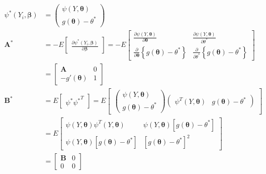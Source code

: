 \documentclass[
  letterpaper,
  DIV=11,
  numbers=noendperiod]{scrreprt}
\begin{document}
\[\begin{aligned}
\psi^* (Y_i, \boldsymbol \beta) &= \begin{pmatrix} \psi(Y, \boldsymbol \theta) \\ g(\boldsymbol \theta) - \theta^* \end{pmatrix} \\
\mathbf A^* &= - E \begin{bmatrix} \frac{\partial \psi^* (Y_i, \boldsymbol \beta)}{\partial \boldsymbol \beta} \end{bmatrix} 
= - E \begin{bmatrix} \frac{\partial \psi(Y, \boldsymbol \theta)}{\partial \boldsymbol \theta}  &
\frac{\partial \psi(Y, \boldsymbol \theta)}{\partial \theta^*} \\
\frac{\partial}{\partial \boldsymbol \theta} \left\{ g(\boldsymbol \theta) - \theta^*\right\} & 
\frac{\partial}{\partial \theta^*} \left\{ g(\boldsymbol \theta) - \theta^*\right\} \end{bmatrix} \\
&= \begin{bmatrix} \mathbf A & 0 \\ -g'(\boldsymbol \theta) & 1\end{bmatrix} \\
\mathbf B^*&= E\begin{bmatrix} \psi^* {\psi^*}^T \end{bmatrix} 
= E\begin{bmatrix} \begin{pmatrix} \psi(Y, \boldsymbol \theta) \\ g(\boldsymbol \theta) - \theta^* \end{pmatrix}
\begin{pmatrix} \psi^T(Y, \boldsymbol \theta) & g(\boldsymbol \theta) - \theta^* \end{pmatrix} \end{bmatrix} \\
&=E\begin{bmatrix} \psi(Y, \boldsymbol \theta) \psi^T(Y, \boldsymbol \theta) & 
\psi(Y, \boldsymbol \theta)[g(\boldsymbol \theta) - \theta^*] \\
\psi(Y, \boldsymbol \theta)[g(\boldsymbol \theta) - \theta^*] &
[g(\boldsymbol \theta) - \theta^*]^2 \end{bmatrix} \\
&= \begin{bmatrix} \mathbf B & 0 \\ 0 & 0 \end{bmatrix} \\

\end{aligned}\]
\end{document}
